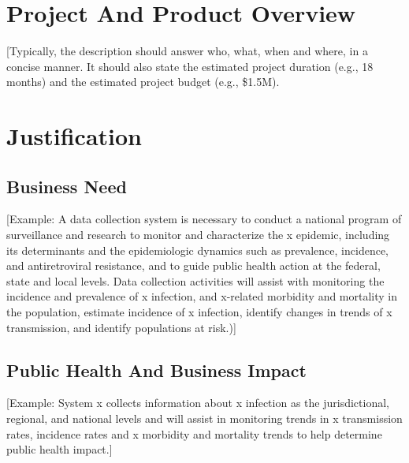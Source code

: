 \documentclass[11pt]{article}
\begin{document}
\section{Project And Product Overview}
\label{sec:org8e6aa9c}
[Typically, the description should answer who, what, when and where, in a concise manner.  It should also state the estimated project duration (e.g., 18 months) and the estimated project budget (e.g., \$1.5M). 
\section{Justification}
\label{sec:org34eba1e}
\subsection{Business Need}
\label{sec:orgd913c5f}
[Example: A data collection system is necessary to conduct a national program of surveillance and research to monitor and characterize the x epidemic, including its determinants and the epidemiologic dynamics such as prevalence, incidence, and antiretroviral resistance, and to guide public health action at the federal, state and local levels. Data collection activities will assist with monitoring the incidence and prevalence of x infection, and x-related morbidity and mortality in the population, estimate incidence of x infection, identify changes in trends of x transmission, and identify populations at risk.)]
\subsection{Public Health And Business Impact}
\label{sec:orgbd9ae0c}
[Example: System x collects information about x infection as the jurisdictional, regional, and national levels and will assist in monitoring trends in x transmission rates, incidence rates and x morbidity and mortality trends to help determine public health impact.]
\end{document}
